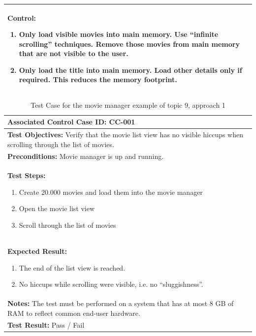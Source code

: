 \begin{table}[p!]
\begin{tabular}{p{}}
		\hline
		\textbf{Control}: 
		\begin{enumerate}
			\item Only load visible movies into main memory. Use \enquote{infinite scrolling} techniques. Remove those movies from main memory that are not visible to the user.
			\item Only load the title into main memory. Load other details only if required. This reduces the memory footprint.
		\end{enumerate} \\
		\hline
	\end{tabular}
\end{table}


%
%
%
\begin{table}[h!]
	\centering
	\caption{Test Case for the movie manager example of topic 9, approach 1}
	\label{tbl:topic_9_test_case}
	\begin{tabular}{p{}}\hline
		\textbf{Associated Control Case ID:} CC-001\\
		\hline
		\textbf{Test Objectives:} \newline Verify that the movie list view has no visible hiccups when scrolling through the list of movies. \\
		\hline
		\textbf{Preconditions:} Movie manager is up and running.\\
		\hline
		\textbf{Test Steps:} \begin{enumerate}
			\item Create 20.000 movies and load them into the movie manager
			\item Open the movie list view
			\item Scroll through the list of movies
		\end{enumerate} \\
		\hline
		\textbf{Expected Result:} \begin{enumerate}
			\item The end of the list view is reached.
			\item No hiccups while scrolling were visible, i.e. no \enquote{sluggishness}.
		\end{enumerate} \\
		\hline
		\textbf{Notes:} \newline
		The test must be performed on a system that has at most 8 GB of RAM to reflect common end-user hardware. \\
		\hline
		\textbf{Test Result:} Pass / Fail \\
		\hline
										
	\end{tabular}
\end{table}

